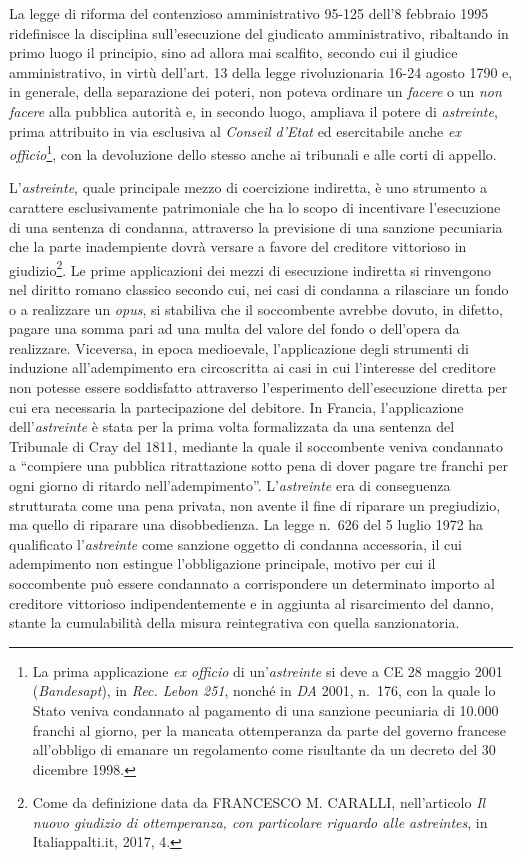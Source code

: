 \documentclass[12pt,it,a4paper,]{report}
\begin{document}
La legge di riforma del contenzioso amministrativo 95-125 dell'8
febbraio 1995 ridefinisce la disciplina sull'esecuzione del giudicato
amministrativo, ribaltando in primo luogo il principio, sino ad allora
mai scalfito, secondo cui il giudice amministrativo, in virtù dell'art.
13 della legge rivoluzionaria 16-24 agosto 1790 e, in generale, della
separazione dei poteri, non poteva ordinare un \emph{facere} o un
\emph{non facere} alla pubblica autorità e, in secondo luogo, ampliava
il potere di \emph{astreinte}, prima attribuito in via esclusiva al
\emph{Conseil d'Etat} ed esercitabile anche \emph{ex
officio}\footnote{La prima applicazione \emph{ex officio} di
  un'\emph{astreinte} si deve a CE 28 maggio 2001 (\emph{Bandesapt}), in
  \emph{Rec. Lebon 251}, nonché in \emph{DA} 2001, n.~176, con la quale
  lo Stato veniva condannato al pagamento di una sanzione pecuniaria di
  10.000 franchi al giorno, per la mancata ottemperanza da parte del
  governo francese all'obbligo di emanare un regolamento come risultante
  da un decreto del 30 dicembre 1998.}, con la devoluzione dello stesso
anche ai tribunali e alle corti di appello.

L'\emph{astreinte}, quale principale mezzo di coercizione indiretta, è
uno strumento a carattere esclusivamente patrimoniale che ha lo scopo di
incentivare l'esecuzione di una sentenza di condanna, attraverso la
previsione di una sanzione pecuniaria che la parte inadempiente dovrà
versare a favore del creditore vittorioso in giudizio\footnote{Come da
  definizione data da FRANCESCO M. CARALLI, nell'articolo \emph{Il nuovo
  giudizio di ottemperanza, con particolare riguardo alle astreintes},
  in Italiappalti.it, 2017, 4.}. Le prime applicazioni dei mezzi di
esecuzione indiretta si rinvengono nel diritto romano classico secondo
cui, nei casi di condanna a rilasciare un fondo o a realizzare un
\emph{opus}, si stabiliva che il soccombente avrebbe dovuto, in difetto,
pagare una somma pari ad una multa del valore del fondo o dell'opera da
realizzare. Viceversa, in epoca medioevale, l'applicazione degli
strumenti di induzione all'adempimento era circoscritta ai casi in cui
l'interesse del creditore non potesse essere soddisfatto attraverso
l'esperimento dell'esecuzione diretta per cui era necessaria la
partecipazione del debitore. In Francia, l'applicazione
dell'\emph{astreinte} è stata per la prima volta formalizzata da una
sentenza del Tribunale di Cray del 1811, mediante la quale il
soccombente veniva condannato a ``compiere una pubblica ritrattazione
sotto pena di dover pagare tre franchi per ogni giorno di ritardo
nell'adempimento''. L'\emph{astreinte} era di conseguenza strutturata
come una pena privata, non avente il fine di riparare un pregiudizio, ma
quello di riparare una disobbedienza. La legge n.~626 del 5 luglio 1972
ha qualificato l'\emph{astreinte} come sanzione oggetto di condanna
accessoria, il cui adempimento non estingue l'obbligazione principale,
motivo per cui il soccombente può essere condannato a corrispondere un
determinato importo al creditore vittorioso indipendentemente e in
aggiunta al risarcimento del danno, stante la cumulabilità della misura
reintegrativa con quella sanzionatoria.
\end{document}
